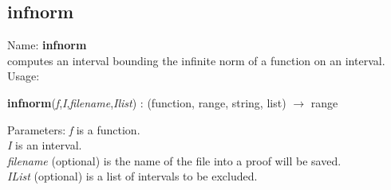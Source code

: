 \subsection{ infnorm }
\noindent Name: \textbf{infnorm}\\
computes an interval bounding the infinite norm of a function on an interval.\\

\noindent Usage: 
\begin{center}
\textbf{infnorm}(\emph{f},\emph{I},\emph{filename},\emph{Ilist}) : (\textsf{function}, \textsf{range}, \textsf{string}, \textsf{list}) $\rightarrow$ \textsf{range}\\
\end{center}
Parameters: 
\emph{f} is a function.\\
\emph{I} is an interval.\\
\emph{filename} (optional) is the name of the file into a proof will be saved.\\
\emph{IList} (optional) is a list of intervals to be excluded.\\

